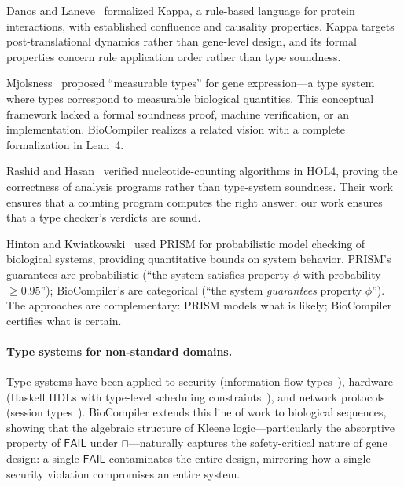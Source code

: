 \documentclass[acmsmall,review,anonymous]{acmart}
\newcommand{\FAIL}{\ensuremath{\mathsf{FAIL}}\xspace}
\begin{document}
Danos and Laneve~\cite{danos2004formal} formalized Kappa, a rule-based
language for protein interactions, with established confluence and
causality properties.  Kappa targets post-translational dynamics rather
than gene-level design, and its formal properties concern rule
application order rather than type soundness.

Mjolsness~\cite{mjolsness2010measurable} proposed ``measurable types''
for gene expression---a type system where types correspond to measurable
biological quantities.  This conceptual framework lacked a formal
soundness proof, machine verification, or an implementation.  BioCompiler
realizes a related vision with a complete formalization in Lean~4.

Rashid and Hasan~\cite{rashid2017hol4} verified nucleotide-counting
algorithms in HOL4, proving the correctness of analysis programs rather
than type-system soundness.  Their work ensures that a counting program
computes the right answer; our work ensures that a type checker's
verdicts are sound.

Hinton and Kwiatkowski~\cite{hinton2006prism} used PRISM for
probabilistic model checking of biological systems, providing
quantitative bounds on system behavior.  PRISM's guarantees are
probabilistic (``the system satisfies property $\phi$ with probability
$\ge 0.95$''); BioCompiler's are categorical (``the system
\emph{guarantees} property $\phi$'').  The approaches are complementary:
PRISM models what is likely; BioCompiler certifies what is certain.

\paragraph{Type systems for non-standard domains.}
Type systems have been applied to security (information-flow
types~\cite{abadi2000security}), hardware (Haskell HDLs with
type-level scheduling constraints~\cite{hanna2010hardware}), and network
protocols (session types~\cite{mandel2005bidirectional}).  BioCompiler
extends this line of work to biological sequences, showing that the
algebraic structure of Kleene logic---particularly the absorptive
property of $\FAIL$ under $\sqcap$---naturally captures the
safety-critical nature of gene design: a single \FAIL{} contaminates the
entire design, mirroring how a single security violation compromises an
entire system.
\end{document}
